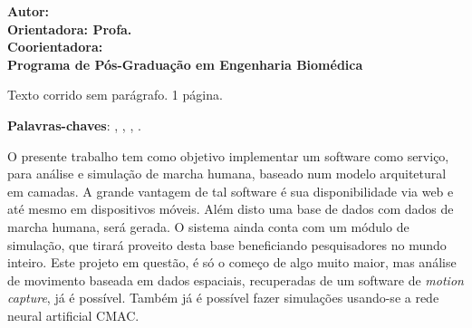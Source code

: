 \begin{resumo}

\begin{center}
\textbf{\imprimirtitulo}
\end{center}

\begin{flushleft}
\footnotesize
\textbf{Autor: \imprimirautor }\\
\textbf{Orientadora: Profa. \imprimirorientador }\\
\textbf{Coorientadora: \imprimirmembroCoorientador} \\
\textbf{Programa de Pós-Graduação em Engenharia Biomédica} \\
\textbf{\imprimirlocal \imprimirdata }
\end{flushleft}

Texto corrido sem parágrafo. 1 página.

\vspace{\onelineskip}
    
 \noindent
 \textbf{Palavras-chaves}: \imprimirpalavrachaveum, \imprimirpalavrachavedois, 
			    \imprimirpalavrachavetres, \imprimirpalavrachavequatro.

O presente trabalho tem como objetivo implementar um software como serviço, para análise e simulação de marcha humana, baseado num modelo arquitetural em camadas. A grande vantagem de tal software é sua disponibilidade via web e até mesmo em dispositivos móveis. Além disto uma base de dados com dados de marcha humana, será gerada. O sistema ainda conta com um módulo de simulação, que tirará proveito desta base beneficiando pesquisadores no mundo inteiro. Este projeto em questão, é só o começo de algo muito maior, mas análise de movimento baseada em dados espaciais, recuperadas de um software de \emph{motion capture}, já é possível. Também já é possível fazer simulações usando-se  a rede neural artificial CMAC.

\end{resumo}

